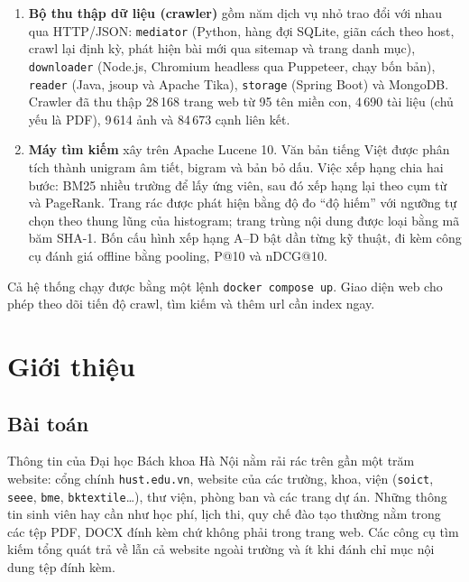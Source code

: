 \documentclass[12pt,a4paper]{report}
\begin{document}
\begin{enumerate}
  \item \textbf{Bộ thu thập dữ liệu (crawler)} gồm năm dịch vụ nhỏ trao đổi với nhau qua HTTP/JSON:
        \texttt{mediator} (Python, hàng đợi SQLite, giãn cách theo host, crawl lại định kỳ, phát hiện bài mới qua sitemap và trang danh mục),
        \texttt{downloader} (Node.js, Chromium headless qua Puppeteer, chạy bốn bản),
        \texttt{reader} (Java, jsoup và Apache Tika),
        \texttt{storage} (Spring Boot) và MongoDB. Crawler đã thu thập
        28\,168 trang web từ 95 tên miền con, 4\,690 tài liệu (chủ yếu là PDF), 9\,614 ảnh và 84\,673 cạnh liên kết.
  \item \textbf{Máy tìm kiếm} xây trên Apache Lucene 10. Văn bản tiếng Việt được phân tích thành unigram âm tiết,
        bigram và bản bỏ dấu. Việc xếp hạng chia hai bước: BM25 nhiều trường để lấy ứng viên, sau đó xếp hạng lại theo
        cụm từ và PageRank. Trang rác được phát hiện bằng độ đo ``độ hiếm'' với ngưỡng tự chọn theo thung lũng của
        histogram; trang trùng nội dung được loại bằng mã băm SHA-1. Bốn cấu hình xếp hạng A--D bật dần từng kỹ thuật,
        đi kèm công cụ đánh giá offline bằng pooling, P@10 và nDCG@10.
\end{enumerate}

Cả hệ thống chạy được bằng một lệnh \texttt{docker compose up}. Giao diện web cho phép theo dõi tiến độ crawl, tìm
kiếm và thêm url cần index ngay.

\tableofcontents
\listoffigures
\listoftables

\cleardoublepage
{}

\chapter{Giới thiệu}

\section{Bài toán}

Thông tin của Đại học Bách khoa Hà Nội nằm rải rác trên gần một trăm website: cổng chính \texttt{hust.edu.vn}, website
của các trường, khoa, viện (\texttt{soict}, \texttt{seee}, \texttt{bme}, \texttt{bktextile}\ldots), thư viện, phòng ban
và các trang dự án. Những thông tin sinh viên hay cần như học phí, lịch thi, quy chế đào tạo thường nằm trong các tệp
PDF, DOCX đính kèm chứ không phải trong trang web. Các công cụ tìm kiếm tổng quát trả về lẫn cả website ngoài trường
và ít khi đánh chỉ mục nội dung tệp đính kèm.
\end{document}
